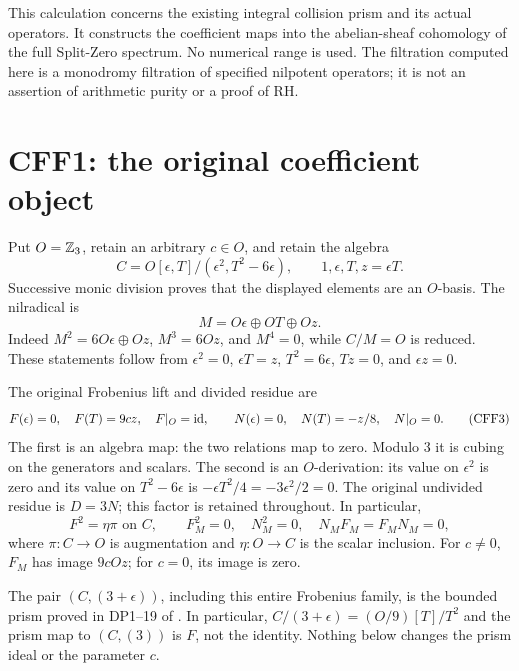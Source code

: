 


This calculation concerns the existing integral collision prism and
its actual operators. It constructs the coefficient maps into the
abelian-sheaf cohomology of the full Split-Zero spectrum. No numerical
range is used. The filtration computed here is a monodromy filtration
of specified nilpotent operators; it is not an assertion of arithmetic
purity or a proof of RH.

\section{CFF1: the original coefficient object}
Put \(O=\mathbb Z_3\), retain an arbitrary \(c\in O\), and retain the algebra
\[
 C=O[\epsilon,T]/(\epsilon^2,T^2-6\epsilon),\qquad
 1,\epsilon,T,z=\epsilon T.
 \tag{CFF1}
\]
Successive monic division proves that the displayed elements are an
\(O\)-basis. The nilradical is
\[
 M=O\epsilon\oplus OT\oplus Oz.
 \tag{CFF2}
\]
Indeed \(M^2=6O\epsilon\oplus Oz\), \(M^3=6Oz\), and \(M^4=0\), while
\(C/M=O\) is reduced. These statements follow from
\(\epsilon^2=0\), \(\epsilon T=z\), \(T^2=6\epsilon\),
\(Tz=0\), and \(\epsilon z=0\).

The original Frobenius lift and divided residue are
\[
 F(\epsilon)=0,\quad F(T)=9cz,\quad F|_O=\operatorname{id},\qquad
 N(\epsilon)=0,\quad N(T)=-z/8,\quad N|_O=0 .
 \tag{CFF3}
\]
The first is an algebra map: the two relations map to zero.
Modulo 3 it is cubing on the generators and scalars. The second is
an \(O\)-derivation: its value on \(\epsilon^2\) is zero and its
value on \(T^2-6\epsilon\) is
\(-\epsilon T^2/4=-3\epsilon^2/2=0\). The original undivided residue
is \(D=3N\); this factor is retained throughout. In particular,
\[
 F^2=\eta\pi\text{ on }C,\qquad
 F_M^2=0,\quad N_M^2=0,\quad N_MF_M=F_MN_M=0,
 \tag{CFF4}
\]
where \(\pi:C\to O\) is augmentation and \(\eta:O\to C\) is the
scalar inclusion. For \(c\ne0\), \(F_M\) has image \(9cOz\); for
\(c=0\), its image is zero.

The pair \((C,(3+\epsilon))\), including this entire Frobenius family,
is the bounded prism proved in DP1--19 of
.
In particular, \(C/(3+\epsilon)=(O/9)[T]/T^2\) and the prism map
to \((C,(3))\) is \(F\), not the identity. Nothing below changes
the prism ideal or the parameter \(c\).


